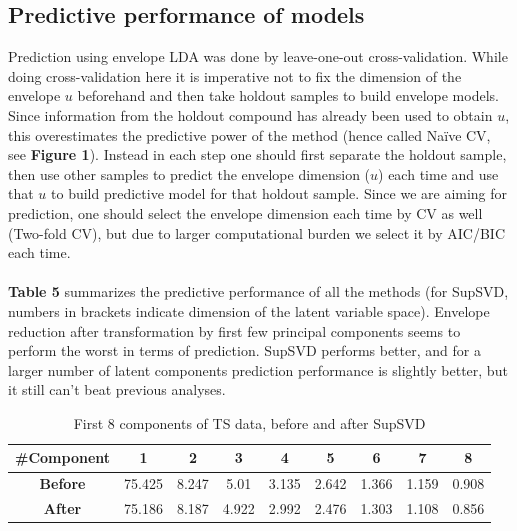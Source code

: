 \documentclass[11pt]{llncs}
\begin{document}
\subsection{Predictive performance of models} Prediction using envelope LDA was done by leave-one-out cross-validation. While doing cross-validation here it is imperative not to fix the dimension of the envelope $u$ beforehand and then take holdout samples to build envelope models. Since information from the holdout compound has already been used to obtain $u$, this overestimates the predictive power of the method (hence called Na\"{i}ve CV, see \textbf{Figure 1}). Instead in each step one should first separate the holdout sample, then use other samples to predict the envelope dimension ($u$) each time and use that $u$ to build predictive model for that holdout sample. Since we are aiming for prediction, one should select the envelope dimension each time by CV as well (Two-fold CV), but due to larger computational burden we select it by AIC/BIC each time.

\paragraph{}\textbf{Table 5} summarizes the predictive performance of all the methods (for SupSVD, numbers in brackets indicate dimension of the latent variable space). Envelope reduction after transformation by first few principal components seems to perform the worst in terms of prediction. SupSVD performs better, and for a larger number of latent components prediction performance is slightly better, but it still can't beat previous analyses.

\begin{table}[t]\centering
    \begin{tabular}{|c|c|c|c|c|c|c|c|c|}
    \hline
    \#\textbf{Component} &  1       & 2     & 3    & 4     & 5     & 6     & 7     & 8     \\ \hline
    \textbf{Before}       & \hspace{.2cm}75.425\hspace{.2cm} & \hspace{.2cm}8.247\hspace{.2cm} & \hspace{.2cm}5.01\hspace{.2cm} & \hspace{.2cm}3.135\hspace{.2cm} & \hspace{.2cm}2.642\hspace{.2cm} & \hspace{.2cm}1.366\hspace{.2cm} & \hspace{.2cm}1.159\hspace{.2cm} & \hspace{.2cm}0.908\hspace{.2cm} \\\hline
    \textbf{After}        & 75.186 & 8.187 & 4.922 & 2.992 & 2.476 & 1.303  & 1.108 & 0.856 \\ \hline
    \end{tabular}
    \caption{First 8 components of TS data, before and after SupSVD}
\end{table}
\end{document}
